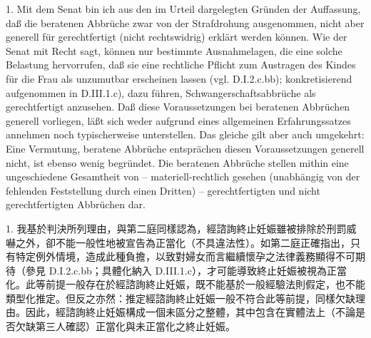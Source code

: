 \documentclass[12pt]{article}
\begin{document}
\begin{sourcepara}[title={原文SondervotumB.318}]
1. Mit dem Senat bin ich aus den im Urteil dargelegten Gründen der Auffassung, daß die beratenen Abbrüche zwar von der Strafdrohung ausgenommen, nicht aber generell für gerechtfertigt (nicht rechtswidrig) erklärt werden können. Wie der Senat mit Recht sagt, können nur bestimmte Ausnahmelagen, die eine solche Belastung hervorrufen, daß sie eine rechtliche Pflicht zum Austragen des Kindes für die Frau als unzumutbar erscheinen lassen (vgl. D.I.2.c.bb); konkretisierend aufgenommen in D.III.1.c), dazu führen, Schwangerschaftsabbrüche als gerechtfertigt anzusehen. Daß diese Voraussetzungen bei beratenen Abbrüchen generell vorliegen, läßt sich weder aufgrund eines allgemeinen Erfahrungssatzes annehmen noch typischerweise unterstellen. Das gleiche gilt aber auch umgekehrt: Eine Vermutung, beratene Abbrüche entsprächen diesen Voraussetzungen generell nicht, ist ebenso wenig begründet. Die beratenen Abbrüche stellen mithin eine ungeschiedene Gesamtheit von -- materiell-rechtlich gesehen (unabhängig von der fehlenden Feststellung durch einen Dritten) -- gerechtfertigten und nicht gerechtfertigten Abbrüchen dar.
\end{sourcepara}
\begin{transpara}
1. 我基於判決所列理由，與第二庭同樣認為，經諮詢終止妊娠雖被排除於刑罰威嚇之外，卻不能一般性地被宣告為正當化（不具違法性）。如第二庭正確指出，只有特定例外情境，造成此種負擔，以致對婦女而言繼續懷孕之法律義務顯得不可期待（參見 D.I.2.c.bb；具體化納入 D.III.1.c），才可能導致終止妊娠被視為正當化。此等前提一般存在於經諮詢終止妊娠，既不能基於一般經驗法則假定，也不能類型化推定。但反之亦然：推定經諮詢終止妊娠一般不符合此等前提，同樣欠缺理由。因此，經諮詢終止妊娠構成一個未區分之整體，其中包含在實體法上（不論是否欠缺第三人確認）正當化與未正當化之終止妊娠。
\end{transpara}
\end{document}

